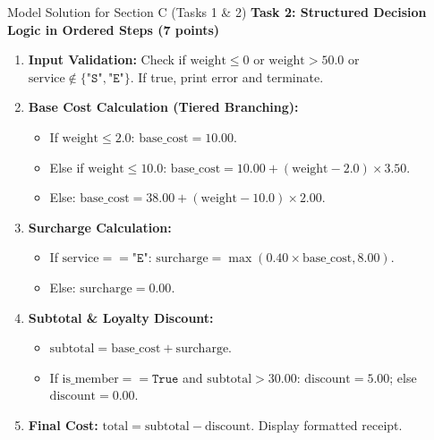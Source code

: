 \documentclass[11pt,a4paper]{article}
\begin{document}
\begin{solbox}{Model Solution for Section C (Tasks 1 \& 2)}
\vspace{0.15cm}
\textbf{Task 2: Structured Decision Logic in Ordered Steps (7 points)}
\begin{enumerate}[leftmargin=2em, label=Step \arabic*:]
  \item \textbf{Input Validation:} Check if $\text{weight} \le 0$ or $\text{weight} > 50.0$ or $\text{service} \notin \{\texttt{"S"}, \texttt{"E"}\}$. If true, print error and terminate.
  \item \textbf{Base Cost Calculation (Tiered Branching):}
    \begin{itemize}
      \item If $\text{weight} \le 2.0$: $\text{base\_cost} = 10.00$.
      \item Else if $\text{weight} \le 10.0$: $\text{base\_cost} = 10.00 + (\text{weight} - 2.0) \times 3.50$.
      \item Else: $\text{base\_cost} = 38.00 + (\text{weight} - 10.0) \times 2.00$.
    \end{itemize}
  \item \textbf{Surcharge Calculation:}
    \begin{itemize}
      \item If $\text{service} == \texttt{"E"}$: $\text{surcharge} = \max(0.40 \times \text{base\_cost}, 8.00)$.
      \item Else: $\text{surcharge} = 0.00$.
    \end{itemize}
  \item \textbf{Subtotal \& Loyalty Discount:}
    \begin{itemize}
      \item $\text{subtotal} = \text{base\_cost} + \text{surcharge}$.
      \item If $\text{is\_member} == \texttt{True}$ and $\text{subtotal} > 30.00$: $\text{discount} = 5.00$; else $\text{discount} = 0.00$.
    \end{itemize}
  \item \textbf{Final Cost:} $\text{total} = \text{subtotal} - \text{discount}$. Display formatted receipt.
\end{enumerate}
\end{solbox}

\vspace{0.2cm}
\end{document}
